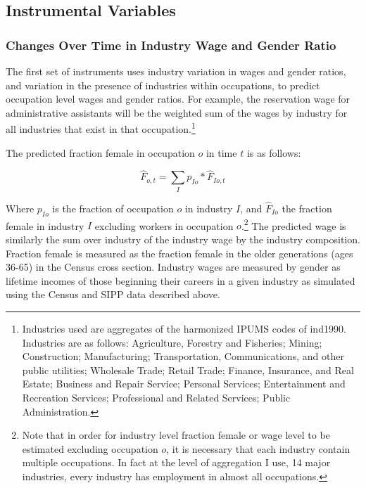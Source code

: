 \documentclass[11pt]{article}
\begin{document}




\subsection{Instrumental Variables}
\subsubsection{Changes Over Time in Industry Wage and Gender Ratio}
The first set of instruments uses industry variation in wages and gender ratios, and variation in the presence of industries within occupations, to predict occupation level wages and gender ratios. For example, the reservation wage for administrative assistants will be the weighted sum of the wages by industry for all industries that exist in that occupation.\footnote{Industries used are aggregates of the harmonized IPUMS codes of ind1990. Industries are as follows: Agriculture, Forestry and Fisheries; Mining; Construction; Manufacturing; Transportation, Communications, and other public utilities; Wholesale Trade; Retail Trade; Finance, Insurance, and Real Estate; Business and Repair Service; Personal Services; Entertainment and Recreation Services; Professional and Related Services; Public Administration.}


The predicted fraction female in occupation $o$ in time $t$ is as follows:

$$\hat{F}_{o,t} = \sum_I  p_{Io}*\hat{F}_{Io,t} $$

Where $p_{Io}$ is the fraction of occupation $o$ in industry $I$, and $\hat{F}_{Io}$ the fraction female in industry $I$ excluding workers in occupation $o$.\footnote{Note that in order for industry level fraction female or wage level to be estimated excluding occupation $o$, it is necessary that each industry contain multiple occupations. In fact at the level of aggregation I use, 14 major industries, every industry has employment in almost all occupations.} The predicted wage is similarly the sum over industry of the industry wage by the industry composition. Fraction female is measured as the fraction female in the older generations (ages 36-65) in the Census cross section. Industry wages are measured by gender as lifetime incomes of those beginning their careers in a given industry as simulated using the Census and SIPP data described above.
\end{document}
